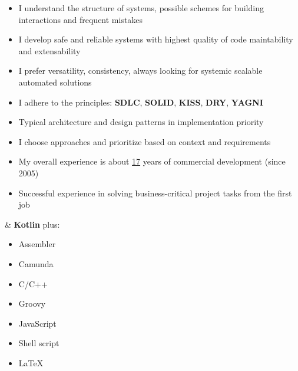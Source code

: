     \begin{minipage}[t]{0.76\textwidth} %
        \vspace{-\baselineskip} %
        

        \begin{itemize}[leftmargin=.0in]
        	\setlength\itemsep{0em}
            \item I understand the structure of systems, possible schemes for building interactions and frequent mistakes
            \item I develop safe and reliable systems with highest quality of code maintability and extensability
            \item I prefer versatility, consistency, always looking for systemic scalable automated solutions
            \item I adhere to the principles: \textbf{SDLC}, \textbf{SOLID}, \textbf{KISS}, \textbf{DRY}, \textbf{YAGNI}
            \item Typical architecture and design patterns in implementation priority
            \item I choose approaches and prioritize based on context and requirements
            \item My overall experience is about \underline{17} years of commercial development (since 2005)
            \item Successful experience in solving business-critical project tasks from the first job
        \end{itemize}

    \end{minipage}
    \hfill %
    \begin{minipage}[t]{0.20\textwidth} %
        \vspace{-\baselineskip}
        
        
         \& \textbf{Kotlin} plus:
        \begin{itemize}[leftmargin=.2in]
        	\setlength\itemsep{0em}
        	\item Assembler
        	\item Camunda
        	\item C/C++
           	\item Groovy
           	\item JavaScript
           	\item Shell script
            
            
            \item \LaTeX
        \end{itemize}
    \end{minipage}

\vspace{0.4cm}